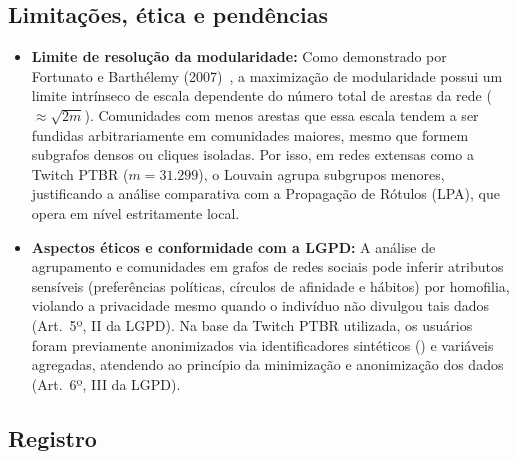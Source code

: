 \subsection{Limitações, ética e pendências}
\begin{itemize}[leftmargin=*]
  \item \textbf{Limite de resolução da modularidade:} Como demonstrado por Fortunato e Barth{\'e}lemy (2007)~\cite{fortunato2007}, 
  a maximização de modularidade possui um limite intrínseco de escala dependente do número total de arestas da rede ($\approx \sqrt{2m}$). 
  Comunidades com menos arestas que essa escala tendem a ser fundidas arbitrariamente em comunidades maiores, mesmo que formem subgrafos densos ou cliques isoladas. 
  Por isso, em redes extensas como a Twitch PTBR ($m = 31.299$), o Louvain agrupa subgrupos menores, justificando a análise comparativa com a Propagação de 
  Rótulos (LPA), que opera em nível estritamente local.
  \item \textbf{Aspectos éticos e conformidade com a LGPD:} A análise de agrupamento e comunidades em grafos de redes sociais pode inferir atributos sensíveis 
  (preferências políticas, círculos de afinidade e hábitos) por homofilia, violando a privacidade mesmo quando o indivíduo não divulgou tais dados 
  (Art.~5º, II da LGPD). Na base da Twitch PTBR utilizada, os usuários foram previamente anonimizados via identificadores sintéticos () 
  e variáveis agregadas, atendendo ao princípio da minimização e anonimização dos dados (Art.~6º, III da LGPD).
\end{itemize}

\subsection{Registro}
\begin{description}[leftmargin=2.6cm,style=nextline]
\end{description}
